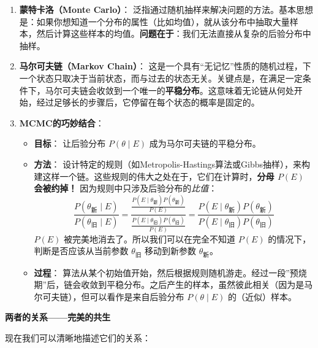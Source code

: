 \documentclass[
  twoside]{book}
\providecommand{\tightlist}{%
  \setlength{\itemsep}{0pt}\setlength{\parskip}{0pt}}
\begin{document}
\begin{enumerate}
\def\labelenumi{\arabic{enumi}.}
\item
  \textbf{蒙特卡洛（Monte Carlo）}： 泛指通过随机抽样来解决问题的方法。基本思想是：如果你想知道一个分布的属性（比如均值），就从该分布中抽取大量样本，然后计算这些样本的均值。\textbf{问题在于}：我们无法直接从复杂的后验分布中抽样。
\item
  \textbf{马尔可夫链（Markov Chain）}： 这是一个具有``无记忆''性质的随机过程，下一个状态只取决于当前状态，而与过去的状态无关。关键点是，在满足一定条件下，马尔可夫链会收敛到一个唯一的\textbf{平稳分布}。这意味着无论链从何处开始，经过足够长的步骤后，它停留在每个状态的概率是固定的。
\item
  \textbf{MCMC的巧妙结合}：

  \begin{itemize}
  \tightlist
  \item
    \textbf{目标}： 让后验分布 \(P(\theta \mid E)\) 成为马尔可夫链的平稳分布。
  \item
    \textbf{方法}： 设计特定的规则（如Metropolis-Hastings算法或Gibbs抽样），来构建这样一个链。这些规则的伟大之处在于，它们在计算时，\textbf{分母 \(P(E)\) 会被约掉！} 因为规则中只涉及后验分布的\emph{比值}：
    \[ \frac{P(\theta_{\text{新}} \mid E)}{P(\theta_{\text{旧}} \mid E)} = \frac{\frac{P(E \mid \theta_{\text{新}})P(\theta_{\text{新}})}{P(E)}}{\frac{P(E \mid \theta_{\text{旧}})P(\theta_{\text{旧}})}{P(E)}} = \frac{P(E \mid \theta_{\text{新}})P(\theta_{\text{新}})}{P(E \mid \theta_{\text{旧}})P(\theta_{\text{旧}})} \]
    \(P(E)\) 被完美地消去了。所以我们可以在完全不知道 \(P(E)\) 的情况下，判断是否应该从当前参数 \(\theta_{\text{旧}}\) 移动到新参数 \(\theta_{\text{新}}\)。
  \item
    \textbf{过程}： 算法从某个初始值开始，然后根据规则随机游走。经过一段''预烧期''后，链会收敛到平稳分布。之后产生的样本，虽然彼此相关（因为是马尔可夫链），但可以看作是来自后验分布 \(P(\theta \mid E)\) 的（近似）样本。
  \end{itemize}
\end{enumerate}

\textbf{两者的关系------完美的共生}

现在我们可以清晰地描述它们的关系：
\end{document}

